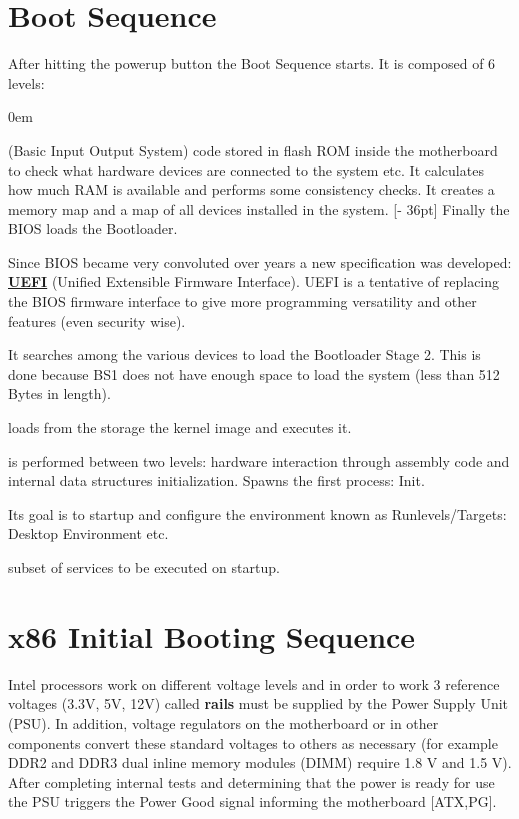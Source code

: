 \documentclass[twoside]{article}
\renewcommand{\cite}[1]{[#1]}
\begin{document}
\section{Boot Sequence}
After hitting the powerup button the Boot Sequence starts. It is composed of 6 levels:
\begin{description}
  \itemsep0em 
  \item[BIOS] (Basic Input Output System) code stored in flash ROM inside the motherboard to check what hardware devices are connected to the system etc. It calculates how much RAM is available and performs some consistency checks. It creates a memory map and a map of all devices installed in the system. [- 36pt]
  Finally the BIOS loads the Bootloader.

  Since BIOS became very convoluted over years a new specification was developed: \href{https://en.wikipedia.org/wiki/Unified_Extensible_Firmware_Interface}{\textbf{UEFI}} (Unified Extensible Firmware Interface). UEFI is a tentative of replacing the BIOS firmware interface to give more programming versatility and other features (even security wise).
  \item[Bootloader Stage 1] It searches among the various devices to load the Bootloader Stage 2. This is done because BS1 does not have enough space to load the system (less than 512 Bytes in length).
  \item[Bootloader Stage 2] loads from the storage the kernel image and executes it. 

  \newpage

  \item[Kernel Startup] is performed between two levels: hardware interaction through assembly code and internal data structures initialization. Spawns the first process: Init.

  \item[Init] Its goal is to startup and configure the environment known as Runlevels/Targets: Desktop Environment etc.
  
  \item[Runlevels/Targets] subset of services to be executed on startup.
\end{description}

\section{x86 Initial Booting Sequence}
Intel processors work on different voltage levels and in order to work 3 reference voltages (3.3V, 5V, 12V) called \textbf{rails} must be supplied by the Power Supply Unit (PSU). In addition, voltage regulators on the motherboard or in other components convert these standard voltages to others as necessary (for example DDR2 and DDR3 dual inline memory modules (DIMM) require 1.8 V and 1.5 V). After completing internal tests and determining that the power is ready for use the PSU triggers the Power Good signal informing the motherboard \cite{ATX,PG}.
\end{document}
